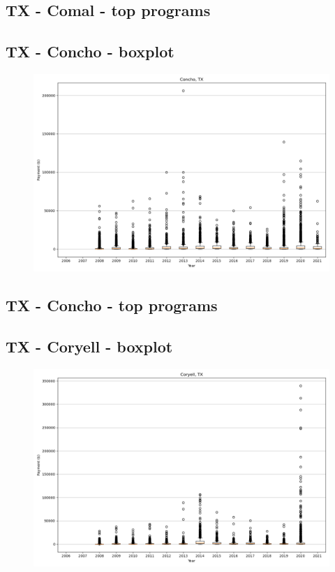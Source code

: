 \subsection*{TX - Comal - top programs}

\newpage
\subsection*{TX - Concho - boxplot}
\begin{figure}[h]
\centering
\includegraphics[width=7in]{../output/boxplots/counties/Concho-TX_boxplot.png}
\end{figure}


\subsection*{TX - Concho - top programs}

\newpage
\subsection*{TX - Coryell - boxplot}
\begin{figure}[h]
\centering
\includegraphics[width=7in]{../output/boxplots/counties/Coryell-TX_boxplot.png}
\end{figure}


